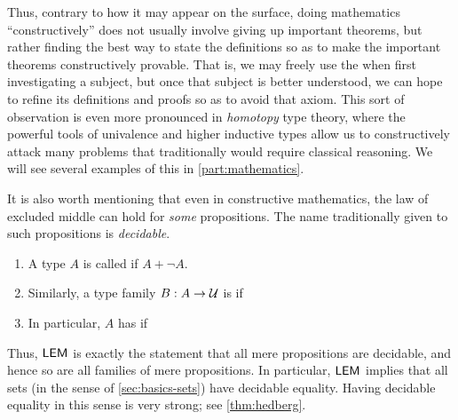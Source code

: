 Thus, contrary to how it may appear on the surface, doing mathematics ``constructively'' does not usually involve giving up important theorems, but rather finding the best way to state the definitions so as to make the important theorems constructively provable.
That is, we may freely use the \LEM{} when first investigating a subject, but once that subject is better understood, we can hope to refine its definitions and proofs so as to avoid that axiom.
This sort of observation is even more pronounced in \emph{homotopy} type theory, where the powerful tools of univalence and higher inductive types allow us to constructively attack many problems that traditionally would require classical reasoning.
We will see several examples of this in \autoref{part:mathematics}.

It is also worth mentioning that even in constructive mathematics, the law of excluded middle can hold for \emph{some} propositions.
The name traditionally given to such propositions is \emph{decidable}.

\begin{defn}\label{defn:decidable-equality}
  \mbox{}
  \begin{enumerate}
  \item A type $A$ is called  if $A+\neg A$.
  \item Similarly, a type family $B:A\to \mathcal{U}$ is  if 
  \item In particular, $A$ has  if 
  \end{enumerate}
\end{defn}

Thus, $\mathsf{LEM}_{}$ is exactly the statement that all mere propositions are decidable, and hence so are all families of mere propositions.
In particular, $\mathsf{LEM}_{}$ implies that all sets (in the sense of \autoref{sec:basics-sets}) have decidable equality.
Having decidable equality in this sense is very strong; see \autoref{thm:hedberg}.


